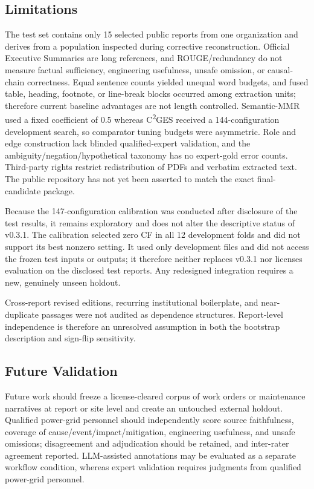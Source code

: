\documentclass[applsci,article,submit,moreauthors]{Definitions/mdpi}
\newcommand{\cges}{C\textsuperscript{2}GES}
\begin{document}
\subsection{Limitations}

The test set contains only 15 selected public reports from one organization and derives from a population inspected during corrective reconstruction. Official Executive Summaries are long references, and ROUGE/redundancy do not measure factual sufficiency, engineering usefulness, unsafe omission, or causal-chain correctness. Equal sentence counts yielded unequal word budgets, and fused table, heading, footnote, or line-break blocks occurred among extraction units; therefore current baseline advantages are not length controlled. Semantic-MMR used a fixed coefficient of 0.5 whereas \cges{} received a 144-configuration development search, so comparator tuning budgets were asymmetric. Role and edge construction lack blinded qualified-expert validation, and the ambiguity/negation/hypothetical taxonomy has no expert-gold error counts. Third-party rights restrict redistribution of PDFs and verbatim extracted text. The public repository has not yet been asserted to match the exact final-candidate package.

Because the 147-configuration calibration was conducted after disclosure of the test results, it remains exploratory and does not alter the descriptive status of v0.3.1. The calibration selected zero CF in all 12 development folds and did not support its best nonzero setting. It used only development files and did not access the frozen test inputs or outputs; it therefore neither replaces v0.3.1 nor licenses evaluation on the disclosed test reports. Any redesigned integration requires a new, genuinely unseen holdout.

Cross-report revised editions, recurring institutional boilerplate, and near-duplicate passages were not audited as dependence structures. Report-level independence is therefore an unresolved assumption in both the bootstrap description and sign-flip sensitivity.

\subsection{Future Validation}

Future work should freeze a license-cleared corpus of work orders or maintenance narratives at report or site level and create an untouched external holdout. Qualified power-grid personnel should independently score source faithfulness, coverage of cause/event/impact/mitigation, engineering usefulness, and unsafe omissions; disagreement and adjudication should be retained, and inter-rater agreement reported. LLM-assisted annotations may be evaluated as a separate workflow condition, whereas expert validation requires judgments from qualified power-grid personnel.
\end{document}
